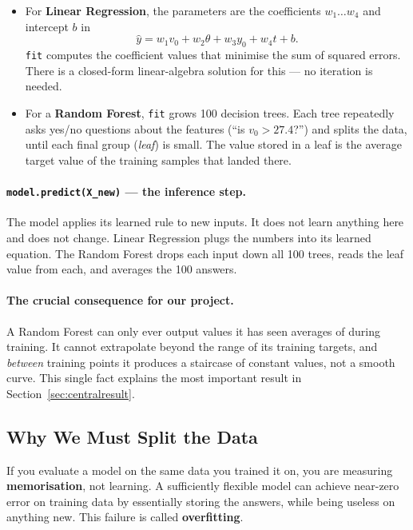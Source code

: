 \documentclass[11pt,a4paper]{article}
\newcommand{\vzero}{v_{0}}
\newcommand{\yzero}{y_{0}}
\begin{document}
\begin{itemize}[leftmargin=2em,itemsep=0.2em]
  \item For \textbf{Linear Regression}, the parameters are the coefficients $w_{1}\dots w_{4}$ and
        intercept $b$ in
        \[
          \hat{y}=w_{1}\vzero+w_{2}\theta+w_{3}\yzero+w_{4}t+b .
        \]
        \texttt{fit} computes the coefficient values that minimise the sum of squared errors. There
        is a closed-form linear-algebra solution for this --- no iteration is needed.
  \item For a \textbf{Random Forest}, \texttt{fit} grows 100 decision trees. Each tree repeatedly
        asks yes/no questions about the features (``is $\vzero>27.4$?'') and splits the data, until
        each final group (\emph{leaf}) is small. The value stored in a leaf is the average target
        value of the training samples that landed there.
\end{itemize}

\paragraph{\texttt{model.predict(X\_new)} --- the inference step.}
The model applies its learned rule to new inputs. It does not learn anything here and does not
change. Linear Regression plugs the numbers into its learned equation. The Random Forest drops each
input down all 100 trees, reads the leaf value from each, and averages the 100 answers.

\paragraph{The crucial consequence for our project.}
A Random Forest can only ever output values it has seen averages of during training. It cannot
extrapolate beyond the range of its training targets, and \emph{between} training points it
produces a staircase of constant values, not a smooth curve. This single fact explains the most
important result in Section~\ref{sec:centralresult}.

\subsection{Why We Must Split the Data}\label{sec:split}

If you evaluate a model on the same data you trained it on, you are measuring
\textbf{memorisation}, not learning. A sufficiently flexible model can achieve near-zero error on
training data by essentially storing the answers, while being useless on anything new. This failure
is called \textbf{overfitting}.
\end{document}
